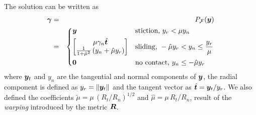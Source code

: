 The solution can be written as
\begin{eqnarray}
	\bgamma &=& P_\mathcal{F}(\vf{y})
    \label{eq:analytical_y_projection}\\
    &=&\begin{dcases}
	\vf{y} 
	& \text{stiction, } y_r < \mu y_n\\
	\begin{bmatrix}
		\mu\gamma_n\hat{\vf{t}}\\
		\frac{1}{1+\tilde\mu^2}\left(y_n +
        \hat\mu y_r\right)
	\end{bmatrix}
	& \text{sliding, } -\hat\mu y_r < y_n \leq \frac{y_r}{\mu}\\
    \vf{0} & \text{no contact, } y_n \leq -\hat\mu y_r
\end{dcases}\nonumber	
\end{eqnarray}
where ${\bm{y}}_t$ and $y_n$ are the tangential and normal components of ${\bm{y}}$,
the radial component is defined as $y_r=\Vert{\bm{y}}_t\Vert$ and the tangent
vector as $\hat{{\bm{t}}}={\bm{y}}_t/y_r$. We also defined the
coefficients $\tilde\mu=\mu\,(R_t/R_n)^{1/2}$ and $\hat\mu=\mu\,R_t/R_n$, result
of the \textit{warping} introduced by the metric ${\bm{R}}$.
